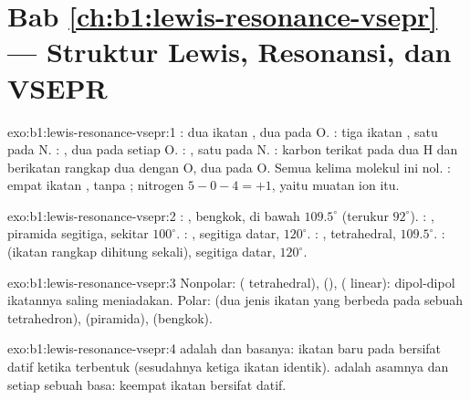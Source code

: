\section*{Bab \ref{ch:b1:lewis-resonance-vsepr} --- Struktur Lewis, Resonansi, dan VSEPR}

\begin{solution}{exo:b1:lewis-resonance-vsepr:1}
: dua ikatan , dua  pada O.
: tiga ikatan , satu  pada N. :
, dua  pada setiap O. : , satu
 pada N. : karbon terikat pada dua H dan berikatan
rangkap dua dengan O, dua  pada O. Semua 
kelima molekul ini nol. : empat ikatan , tanpa ; nitrogen $5 - 0 - 4 = +1$, yaitu muatan ion itu.
\end{solution}

\begin{solution}{exo:b1:lewis-resonance-vsepr:2}
: , bengkok, di bawah $109.5^\circ$ (terukur $92^\circ$).
: , piramida segitiga, sekitar $100^\circ$.
: , segitiga datar, $120^\circ$. : ,
tetrahedral, $109.5^\circ$. :  (ikatan rangkap
dihitung sekali), segitiga datar, $120^\circ$.
\end{solution}

\begin{solution}{exo:b1:lewis-resonance-vsepr:3}
Nonpolar:  ( tetrahedral),  (),
 ( linear): dipol-dipol ikatannya saling meniadakan.
Polar:  (dua jenis ikatan yang berbeda pada sebuah
tetrahedron),  (piramida),  (bengkok).
\end{solution}

\begin{solution}{exo:b1:lewis-resonance-vsepr:4}
 adalah  dan  basanya: ikatan  baru pada
 bersifat datif ketika terbentuk (sesudahnya ketiga ikatan
 identik).  adalah asamnya dan setiap  sebuah
basa: keempat ikatan  bersifat datif.
\end{solution}

